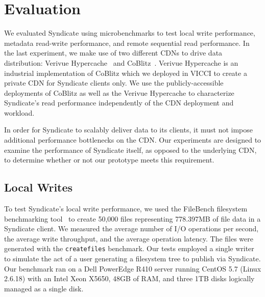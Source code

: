 \section{Evaluation}

We evaluated Syndicate using microbenchmarks to test local write performance, metadata read-write
 performance, and remote sequential read performance.  In the last experiment, 
we make use of two different CDNs to drive data distribution:  Verivue Hypercache~\cite{vcoblitz}
 and CoBlitz~\cite{CoBlitz}.  Verivue Hypercache is an industrial implementation 
of CoBlitz which we deployed in VICCI to create a private CDN for Syndicate clients only.  
We use the publicly-accessible deployments of CoBlitz as well as the Verivue 
Hypercache to characterize Syndicate's read performance independently of the CDN deployment
and workload.

In order for Syndicate to scalably deliver data to its clients, it must
not impose additional performance bottlenecks on the CDN.  Our experiments are 
designed to examine the performance of Syndicate itself, as opposed to
the underlying CDN, to determine whether or not our prototype meets this requirement.

\subsection{Local Writes}

To test Syndicate's local write performance, we used the FileBench filesystem benchmarking 
tool~\cite{filebench} to create 50,000 files representing 778.397MB of file data in a Syndicate client.
We measured the average number of I/O operations per second, the average write throughput, and the average
operation latency.  The files were generated with the \texttt{createfiles} benchmark. 
Our tests employed a single writer to simulate the act of a user generating a filesystem tree
to publish via Syndicate.  Our benchmark ran on a Dell PowerEdge R410 server running
CentOS 5.7 (Linux 2.6.18) with an Intel Xeon X5650, 48GB of RAM, and three 1TB disks logically 
managed as a single disk.

